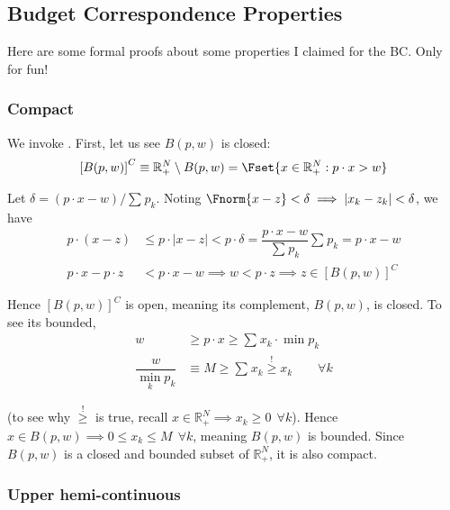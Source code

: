 \documentclass{article}
\begin{document}
\subsection{Budget Correspondence Properties}
\label{sub:appendix_budget_correspondence_properties}

Here are some formal proofs about some properties I claimed for the BC. Only for fun!

\subsubsection{Compact}
\label{ssub:appendix_compact}

We invoke . First, let us see $B(p, w)$ is closed:
\begin{align*}
  \left[B(p, w)\right]^C
  \equiv
  \mathbb{R}^N_+ \setminus B(p, w)
  =
  \Fset{
    x \in \mathbb{R}^N_+:
    p \cdot x > w
  }
\end{align*}

Let $\delta = (p \cdot x - w) / \sum^{}_{} p_k$. Noting $\Fnorm{x - z} < \delta \implies |x_k - z_k| < \delta$, we have
\begin{align*}
  p \cdot (x - z)
  &
  \le
  p \cdot |x - z|
  <
  p \cdot \delta
  =
  \dfrac{p \cdot x - w}{\sum^{}_{} p_k}
  \sum^{}_{} p_k
  =
  p \cdot x - w
  \\
  p \cdot x - p \cdot z
  &
  <
  p \cdot x - w
  \implies
  w
  <
  p \cdot z
  \implies
  z \in \left[B(p, w)\right]^C
\end{align*}

Hence $\left[B(p, w)\right]^C$ is open, meaning its complement, $B(p, w)$, is closed. To see its bounded,
\begin{align*}
  w
  &
  \ge
  p \cdot x
  \ge
  \sum^{}_{} x_k \cdot \min p_k
  \\
  \dfrac{w}{\min_k p_k}
  &
  \equiv
  M
  \ge
  \sum^{}_{} x_k
  \stackrel{!}{\ge}
  x_k
  \quad
  \quad
  \forall k
\end{align*}

(to see why $\stackrel{!}{\ge}$ is true, recall $x \in \mathbb{R}^N_+ \implies x_k \ge 0 ~~ \forall k$).  Hence $x \in B(p, w) \implies 0 \le x_k \le M ~~ \forall k$, meaning $B(p, w)$ is bounded. Since $B(p, w)$ is a closed and bounded subset of $\mathbb{R}^N_+$, it is also compact.

\subsubsection{Upper hemi-continuous}
\label{ssub:appendix_upper_hemi_continuous}
\end{document}

